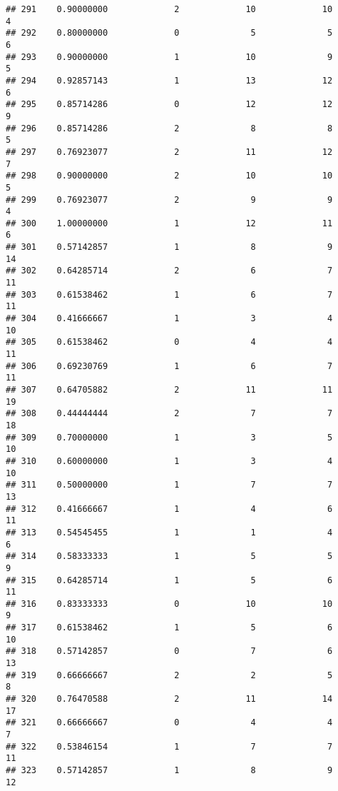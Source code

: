 \documentclass[
]{article}
\begin{document}
\begin{verbatim}
## 291    0.90000000             2             10             10              4
## 292    0.80000000             0              5              5              6
## 293    0.90000000             1             10              9              5
## 294    0.92857143             1             13             12              6
## 295    0.85714286             0             12             12              9
## 296    0.85714286             2              8              8              5
## 297    0.76923077             2             11             12              7
## 298    0.90000000             2             10             10              5
## 299    0.76923077             2              9              9              4
## 300    1.00000000             1             12             11              6
## 301    0.57142857             1              8              9             14
## 302    0.64285714             2              6              7             11
## 303    0.61538462             1              6              7             11
## 304    0.41666667             1              3              4             10
## 305    0.61538462             0              4              4             11
## 306    0.69230769             1              6              7             11
## 307    0.64705882             2             11             11             19
## 308    0.44444444             2              7              7             18
## 309    0.70000000             1              3              5             10
## 310    0.60000000             1              3              4             10
## 311    0.50000000             1              7              7             13
## 312    0.41666667             1              4              6             11
## 313    0.54545455             1              1              4              6
## 314    0.58333333             1              5              5              9
## 315    0.64285714             1              5              6             11
## 316    0.83333333             0             10             10              9
## 317    0.61538462             1              5              6             10
## 318    0.57142857             0              7              6             13
## 319    0.66666667             2              2              5              8
## 320    0.76470588             2             11             14             17
## 321    0.66666667             0              4              4              7
## 322    0.53846154             1              7              7             11
## 323    0.57142857             1              8              9             12

\end{verbatim}
\end{document}
